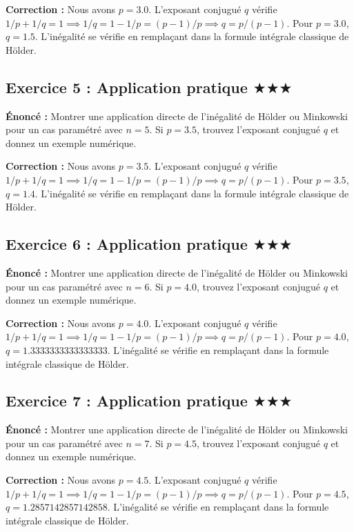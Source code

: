 \documentclass[11pt,a4paper]{article}
\begin{document}
\textbf{Correction :}
Nous avons $p = 3.0$.
L'exposant conjugué $q$ vérifie $1/p + 1/q = 1 \implies 1/q = 1 - 1/p = (p-1)/p \implies q = p/(p-1)$.
Pour $p = 3.0$, $q = 1.5$.
L'inégalité se vérifie en remplaçant dans la formule intégrale classique de Hölder.


\subsection*{Exercice 5 : Application pratique $\bigstar\bigstar\bigstar$}

\textbf{Énoncé :}
Montrer une application directe de l'inégalité de Hölder ou Minkowski pour un cas paramétré avec $n=5$.
Si $p=3.5$, trouvez l'exposant conjugué $q$ et donnez un exemple numérique.

\textbf{Correction :}
Nous avons $p = 3.5$.
L'exposant conjugué $q$ vérifie $1/p + 1/q = 1 \implies 1/q = 1 - 1/p = (p-1)/p \implies q = p/(p-1)$.
Pour $p = 3.5$, $q = 1.4$.
L'inégalité se vérifie en remplaçant dans la formule intégrale classique de Hölder.


\subsection*{Exercice 6 : Application pratique $\bigstar\bigstar\bigstar$}

\textbf{Énoncé :}
Montrer une application directe de l'inégalité de Hölder ou Minkowski pour un cas paramétré avec $n=6$.
Si $p=4.0$, trouvez l'exposant conjugué $q$ et donnez un exemple numérique.

\textbf{Correction :}
Nous avons $p = 4.0$.
L'exposant conjugué $q$ vérifie $1/p + 1/q = 1 \implies 1/q = 1 - 1/p = (p-1)/p \implies q = p/(p-1)$.
Pour $p = 4.0$, $q = 1.3333333333333333$.
L'inégalité se vérifie en remplaçant dans la formule intégrale classique de Hölder.


\subsection*{Exercice 7 : Application pratique $\bigstar\bigstar\bigstar$}

\textbf{Énoncé :}
Montrer une application directe de l'inégalité de Hölder ou Minkowski pour un cas paramétré avec $n=7$.
Si $p=4.5$, trouvez l'exposant conjugué $q$ et donnez un exemple numérique.

\textbf{Correction :}
Nous avons $p = 4.5$.
L'exposant conjugué $q$ vérifie $1/p + 1/q = 1 \implies 1/q = 1 - 1/p = (p-1)/p \implies q = p/(p-1)$.
Pour $p = 4.5$, $q = 1.2857142857142858$.
L'inégalité se vérifie en remplaçant dans la formule intégrale classique de Hölder.
\end{document}
